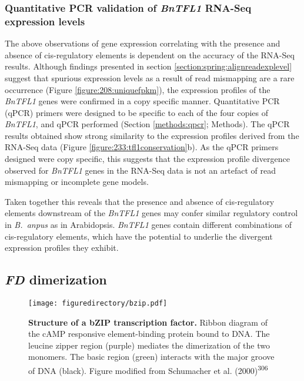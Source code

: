 \documentclass[12pt,]{book}
\begin{document}
\subsubsection{\texorpdfstring{Quantitative PCR validation of
\emph{BnTFL1} RNA-Seq expression
levels}{Quantitative PCR validation of BnTFL1 RNA-Seq expression levels}}\label{section:spring:tfl1qpcr}

The above observations of gene expression correlating with the presence
and absence of cis-regulatory elements is dependent on the accuracy of
the RNA-Seq results. Although findings presented in section
\ref{section:spring:alignreadexplevel} suggest that spurious expression
levels as a result of read mismapping are a rare occurrence (Figure
\ref{figure:208:uniquefpkm}), the expression profiles of the
\emph{BnTFL1} genes were confirmed in a copy specific manner.
Quantitative PCR (qPCR) primers were designed to be specific to each of
the four copies of \emph{BnTFL1}, and qPCR performed (Section
\ref{methods:qpcr}; Methods). The qPCR results obtained show strong
similarity to the expression profiles derived from the RNA-Seq data
(Figure \ref{figure:233:tfl1conservation}b). As the qPCR primers
designed were copy specific, this suggests that the expression profile
divergence observed for \emph{BnTFL1} genes in the RNA-Seq data is not
an artefact of read mismapping or incomplete gene models.

Taken together this reveals that the presence and absence of
cis-regulatory elements downstream of the \emph{BnTFL1} genes may confer
similar regulatory control in \emph{B.~anpus} as in Arabidopsis.
\emph{BnTFL1} genes contain different combinations of cis-regulatory
elements, which have the potential to underlie the divergent expression
profiles they exhibit.

\subsection{\texorpdfstring{\emph{FD}
dimerization}{FD dimerization}}\label{section:spring:fdprotein}

\begin{figure}[htbp]
\centering
\texttt{[image: figuredirectory/bzip.pdf]}
\caption{\textbf{Structure of a bZIP transcription factor.} Ribbon
diagram of the cAMP responsive element-binding protein bound to DNA. The
leucine zipper region (purple) mediates the dimerization of the two
monomers. The basic region (green) interacts with the major groove of
DNA (black). Figure modified from Schumacher et al.
(2000)\textsuperscript{306}}\label{figure:2xx:bzip}
\end{figure}
\end{document}
